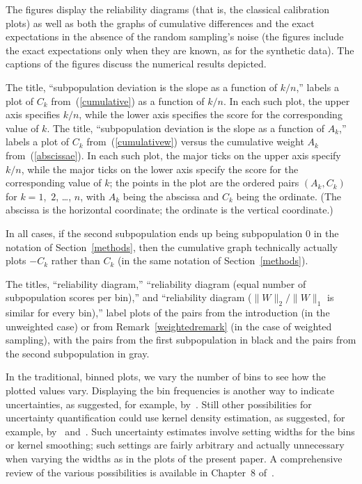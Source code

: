 \documentclass{article}
\begin{document}
The figures display the reliability diagrams
(that is, the classical calibration plots)
as well as both the graphs of cumulative differences and the exact expectations
in the absence of the random sampling's noise (the figures include
the exact expectations only when they are known, as for the synthetic data).
The captions of the figures discuss the numerical results depicted.

The title, ``subpopulation deviation is the slope as a function of $k/n$,''
labels a plot of $C_k$ from~(\ref{cumulative}) as a function of $k/n$.
In each such plot, the upper axis specifies $k/n$,
while the lower axis specifies the score for the corresponding value of $k$.
The title, ``subpopulation deviation is the slope as a function of $A_k$,''
labels a plot of $C_k$ from~(\ref{cumulativew}) versus 
the cumulative weight $A_k$ from~(\ref{abscissae}).
In each such plot, the major ticks on the upper axis specify $k/n$,
while the major ticks on the lower axis specify the score
for the corresponding value of $k$; the points in the plot
are the ordered pairs $(A_k, C_k)$ for $k = 1$,~$2$, \dots, $n$,
with $A_k$ being the abscissa and $C_k$ being the ordinate.
(The abscissa is the horizontal coordinate;
the ordinate is the vertical coordinate.)

In all cases, if the second subpopulation ends up being subpopulation 0
in the notation of Section~\ref{methods}, then the cumulative graph technically
actually plots $-C_k$ rather than $C_k$
(in the same notation of Section~\ref{methods}).

The titles, ``reliability diagram,''
``reliability diagram (equal number of subpopulation scores per bin),''
and ``reliability diagram ($\|W\|_2/\|W\|_1$ is similar for every bin),''
label plots of the pairs from the introduction (in the unweighted case)
or from Remark~\ref{weightedremark} (in the case of weighted sampling),
with the pairs from the first subpopulation in black
and the pairs from the second subpopulation in gray.

In the traditional, binned plots,
we vary the number of bins to see how the plotted values vary.
Displaying the bin frequencies is another way to indicate uncertainties,
as suggested, for example, by~\cite{murphy-winkler}.
Still other possibilities for uncertainty quantification could use
kernel density estimation, as suggested, for example,
by~\cite{brocker} and~\cite{wilks}.
Such uncertainty estimates involve setting widths for the bins
or kernel smoothing; such settings are fairly arbitrary
and actually unnecessary when varying the widths as in the plots
of the present paper.
A comprehensive review of the various possibilities is available
in Chapter~8 of~\cite{wilks}.
\end{document}
